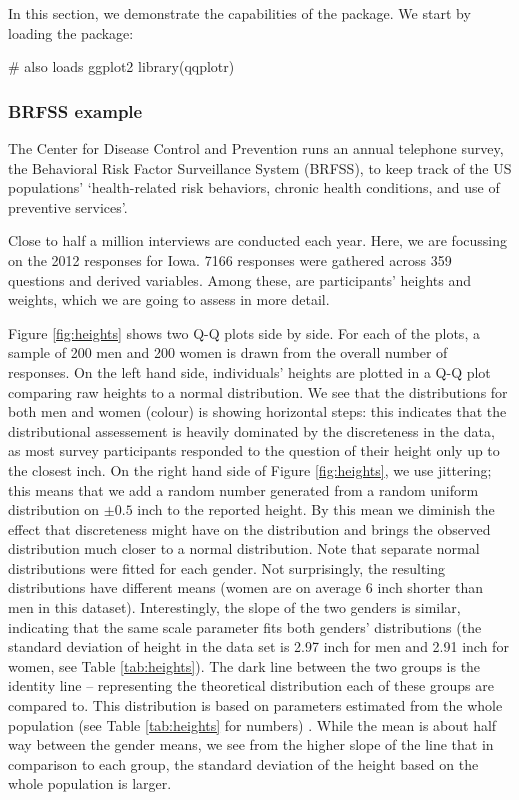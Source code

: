 \label{sec:examples}

In this section, we demonstrate the capabilities of the 
package. We start by loading the package:

\begin{Schunk}
\begin{Sinput}
# also loads ggplot2
library(qqplotr)
\end{Sinput}
\end{Schunk}

\subsubsection{BRFSS example}\label{brfss-example}

The Center for Disease Control and Prevention runs an annual telephone
survey, the Behavioral Risk Factor Surveillance System (BRFSS), to keep
track of the US populations' `health-related risk behaviors, chronic
health conditions, and use of preventive services'.

Close to half a million interviews are conducted each year. Here, we are
focussing on the 2012 responses for Iowa. 7166 responses were gathered
across 359 questions and derived variables. Among these, are
participants' heights and weights, which we are going to assess in more
detail.

Figure \ref{fig:heights} shows two Q-Q plots side by side. For each of
the plots, a sample of 200 men and 200 women is drawn from the overall
number of responses. On the left hand side, individuals' heights are
plotted in a Q-Q plot comparing raw heights to a normal distribution. We
see that the distributions for both men and women (colour) is showing
horizontal steps: this indicates that the distributional assessement is
heavily dominated by the discreteness in the data, as most survey
participants responded to the question of their height only up to the
closest inch. On the right hand side of Figure \ref{fig:heights}, we use
jittering; this means that we add a random number generated from a
random uniform distribution on \(\pm 0.5\) inch to the reported height.
By this mean we diminish the effect that discreteness might have on the
distribution and brings the observed distribution much closer to a
normal distribution. Note that separate normal distributions were fitted
for each gender. Not surprisingly, the resulting distributions have
different means (women are on average 6 inch shorter than men in this
dataset). Interestingly, the slope of the two genders is similar,
indicating that the same scale parameter fits both genders'
distributions (the standard deviation of height in the data set is 2.97
inch for men and 2.91 inch for women, see Table \ref{tab:heights}). The
dark line between the two groups is the identity line -- representing
the theoretical distribution each of these groups are compared to. This
distribution is based on parameters estimated from the whole population
(see Table \ref{tab:heights} for numbers) . While the mean is about half
way between the gender means, we see from the higher slope of the line
that in comparison to each group, the standard deviation of the height
based on the whole population is larger.


